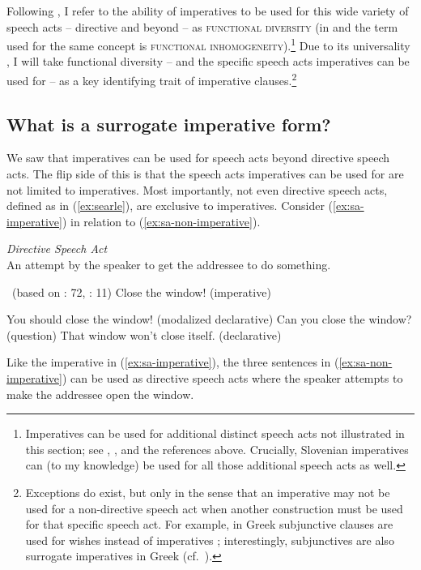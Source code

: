 \documentclass[output=paper,colorlinks,citecolor=brown]{langscibook}
\begin{document}
\noindent Following \citet{condoravdi-lauer12cssp}, I refer to the ability of imperatives to be used for this wide variety of speech acts -- directive and beyond -- as \textsc{functional diversity} (in \citealt{schwagerDISS} and \citealt{kaufmannBOOK} the term used for the same concept is \textsc{functional inhomogeneity}).\footnote{Imperatives can be used for additional distinct speech acts not illustrated in this section; see \citet[][Ch.~4--5]{kaufmannBOOK}, \citet[][\S3.2]{kaufmann21}, and the references above. Crucially, Slovenian imperatives can (to my knowledge) be used for all those additional speech acts as well.}  Due to its universality \citep[see][]{kaufmann21}, I will take functional diversity -- and the specific speech acts imperatives can be used for -- as a key identifying trait of imperative clauses.\footnote{Exceptions do exist, but only in the sense that an imperative may not be used for a non-directive speech act when another construction must be used for that specific speech act. For example, in Greek subjunctive clauses are used for wishes instead of imperatives \citep{oikonomou16}; interestingly, subjunctives are also surrogate imperatives in Greek (cf.~).}

\subsection{What is a surrogate imperative form?}
\label{subsec:surrogate}

We saw that imperatives can be used for speech acts beyond directive speech acts. The flip side of this is that the speech acts imperatives can be used for are not limited to imperatives. Most importantly, not even directive speech acts, defined as in (\ref{ex:searle}), are exclusive to imperatives. Consider (\ref{ex:sa-imperative}) in relation to (\ref{ex:sa-non-imperative}).  
\begin{exe}
\ex \label{ex:searle} \emph{Directive Speech Act}\\ 
An attempt by the speaker to get the addressee to do something. 

~\hfill (based on \citealt{searle69}: 72, \citeyear{searle76}: 11)
\ex \label{ex:sa-imperative} Close the window! \hfill (imperative)%
\ex \label{ex:sa-non-imperative}
\begin{xlist}
\ex \label{ex:sa-mod} You should close the window! \hfill (modalized declarative)%
\ex \label{ex:sa-quest} Can you close the window? \hfill (question)%
\ex \label{ex:sa-indirect} That window won't close itself. \hfill (declarative)%
\end{xlist}
\end{exe}
Like the imperative in (\ref{ex:sa-imperative}), the three sentences in (\ref{ex:sa-non-imperative}) can be used as directive speech acts where the speaker attempts to make the addressee open the window.  
\end{document}
